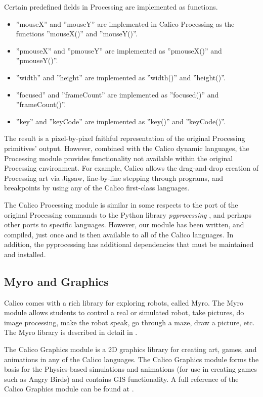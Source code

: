 \documentclass[preprint]{sigplanconf}
\begin{document}
Certain predefined fields in Processing are implemented as functions.

\begin{itemize}
\item ''mouseX'' and ''mouseY'' are implemented in Calico Processing as the functions ''mouseX()'' and ''mouseY()''.
\item ''pmouseX'' and ''pmouseY'' are implemented as ''pmouseX()'' and ''pmouseY()''.
\item ''width'' and ''height'' are implemented as ''width()'' and ''height()''.
\item ''focused'' and ''frameCount'' are implemented as ''focused()'' and ''frameCount()''.
\item ''key'' and ''keyCode'' are implemented as ''key()'' and ''keyCode()''.
\end{itemize}

The result is a pixel-by-pixel faithful representation of the original
Processing primitives' output. However, combined with the Calico
dynamic languages, the Processing module provides functionality not
available within the original Processing environment. For example,
Calico allows the drag-and-drop creation of Processing art via Jigsaw,
line-by-line stepping through programs, and breakpoints by using any
of the Calico first-class languages.

The Calico Processing module is similar in some respects to the port
of the original Processing commands to the Python library
\textit{pyprocessing} \cite{pyprocessing}, and perhaps other ports to
specific languages. However, our module has been written, and
compiled, just once and is then available to all of the Calico
languages. In addition, the pyprocessing has additional dependencies
that must be maintained and installed.

\subsection{Myro and Graphics}

Calico comes with a rich library for exploring robots, called
Myro. The Myro module allows students to control a real or simulated
robot, take pictures, do image processing, make the robot speak, go
through a maze, draw a picture, etc. The Myro library is described in
detail in \cite{blank-etal-2012}.

The Calico Graphics module is a 2D graphics library for creating art,
games, and animations in any of the Calico languages. The Calico
Graphics module forms the basis for the Physics-based simulations and
animations (for use in creating games such as Angry Birds) and
contains GIS functionality. A full reference of the Calico Graphics
module can be found at \cite{calico-graphics}.
\end{document}
